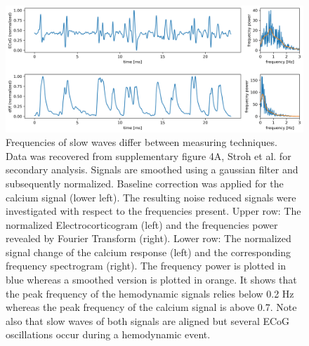\begin{figure}[!htb]
\centering
\includegraphics[width=\textwidth,height=\textheight,keepaspectratio]{Figures/ECoG_calcium_flourescence}
\decoRule
\caption[Frequencies of slow waves differ between measuring techniques]{Frequencies of slow waves differ between measuring techniques.\\
Data was recovered from supplementary figure 4A, Stroh et al. \parencite*{stroh2013making} for secondary analysis. Signals are smoothed using a gaussian filter and subsequently normalized. Baseline correction was applied for the calcium signal (lower left). The resulting noise reduced signals were investigated with respect to the frequencies present. Upper row: The normalized Electrocorticogram (left) and the frequencies power revealed by Fourier Transform (right). Lower row: The normalized signal change of the calcium response (left) and the corresponding frequency spectrogram (right). The frequency power is plotted in blue whereas a smoothed version is plotted in orange. It shows that the peak frequency of the hemodynamic signals relies below 0.2 Hz whereas the peak frequency of the calcium signal is above 0.7. Note also that slow waves of both signals are aligned but several ECoG oscillations occur during a hemodynamic event.\\
}
\label{fig:ECoG_calcium_flourescence}
\end{figure}
